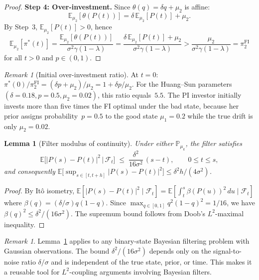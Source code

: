 \documentclass[12pt]{article}
\newtheorem{lemma}[theorem]{Lemma}
\theoremstyle{remark}
\newtheorem{remark}[theorem]{Remark}
\theoremstyle{definition}
\newcommand{\E}{\mathbb{E}}
\newcommand{\Prob}{\mathbb{P}}
\newcommand{\FI}{\mathrm{FI}}
\begin{document}
\begin{proof}
\medskip\noindent\textbf{Step 4: Over-investment.}
Since $\theta(q) = \delta q + \mu_2$ is affine:
\begin{equation}\label{eq:Etheta_bad}
  \E_{\mu_2}[\theta(P(t))] = \delta\,\E_{\mu_2}[P(t)] + \mu_2.
\end{equation}
By Step~3, $\E_{\mu_2}[P(t)] > 0$, hence
\[
  \E_{\mu_2}[\pi^*(t)]
  = \frac{\E_{\mu_2}[\theta(P(t))]}{\sigma^2\gamma(1-\lambda)}
  = \frac{\delta\,\E_{\mu_2}[P(t)] + \mu_2}{\sigma^2\gamma(1-\lambda)}
  > \frac{\mu_2}{\sigma^2\gamma(1-\lambda)}
  = \pi_2^{\FI}
\]
for all $t > 0$ and $p \in (0,1)$.
\end{proof}

\begin{remark}[Initial over-investment ratio]\label{rem:overinvest_quant}
At $t = 0$: $\pi^*(0)/\pi_2^{\FI} = (\delta p + \mu_2)/\mu_2 = 1 + \delta p/\mu_2$.
For the Huang--Sun parameters $(\delta = 0.18, p = 0.5, \mu_2 = 0.02)$,
this ratio equals~$5.5$.
The PI investor initially invests more than five times the FI optimal
under the bad state, because her prior assigns probability~$p = 0.5$ to the
good state $\mu_1 = 0.2$ while the true drift is only $\mu_2 = 0.02$.
\end{remark}



\begin{lemma}[Filter modulus of continuity]\label{lem:filter_modulus}
Under either $\Prob_{\mu_k}$, the filter satisfies
\[
  \E\bigl[|P(s) - P(t)|^2 \,\big|\, \mathcal{F}_t\bigr]
  \;\le\; \frac{\delta^2}{16\sigma^2}\,(s-t),
  \qquad 0 \le t \le s,
\]
and consequently
$\E\bigl[\sup_{s \in [t,t+h]} |P(s) - P(t)|^2\bigr]
  \le \delta^2 h/(4\sigma^2)$.
\end{lemma}

\begin{proof}
By It\^{o} isometry, $\E[|P(s)-P(t)|^2 \mid \mathcal{F}_t]
  = \E[\int_t^s \beta(P(u))^2\,du \mid \mathcal{F}_t]$
where $\beta(q) = (\delta/\sigma)q(1-q)$.
Since $\max_{q \in [0,1]} q^2(1-q)^2 = 1/16$, we have
$\beta(q)^2 \le \delta^2/(16\sigma^2)$.
The supremum bound follows from Doob's $L^2$-maximal inequality.
\end{proof}

\begin{remark}\label{rem:filter_modulus_reusable}
Lemma~\ref{lem:filter_modulus} applies to any binary-state Bayesian
filtering problem with Gaussian observations.
The bound $\delta^2/(16\sigma^2)$ depends only on the signal-to-noise
ratio $\delta/\sigma$ and is independent of the true state, prior, or
time.
This makes it a reusable tool for $L^2$-coupling arguments involving
Bayesian filters.
\end{remark}
\end{document}
